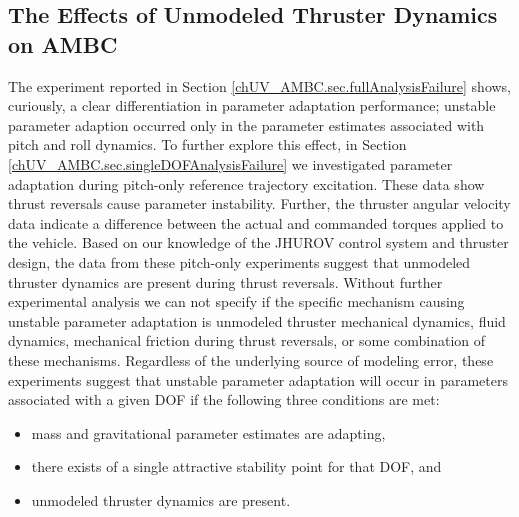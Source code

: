 \subsection{The Effects of Unmodeled Thruster Dynamics on \ac{AMBC}}

The experiment reported in Section
\ref{chUV_AMBC.sec.fullAnalysisFailure} shows, curiously, a clear
differentiation in parameter adaptation performance; unstable
parameter adaption occurred only in the parameter estimates associated
with pitch and roll dynamics.
%
To further explore this effect, in Section
\ref{chUV_AMBC.sec.singleDOFAnalysisFailure} we investigated parameter
adaptation during pitch-only reference trajectory excitation.
%
These data show thrust reversals cause parameter instability.
%
Further, the thruster angular velocity data indicate a difference
between the actual and commanded torques applied to the vehicle. 
%
Based on our knowledge of the \ac{JHUROV} control system and thruster
design, the data from these pitch-only experiments suggest that
unmodeled thruster dynamics are present during thrust reversals.
%
Without further experimental analysis we can not specify if the
specific mechanism causing unstable parameter adaptation is unmodeled
thruster mechanical dynamics, fluid dynamics, mechanical friction
during thrust reversals, or some combination of these mechanisms.
%
Regardless of the underlying source of modeling error, these
experiments suggest that unstable parameter adaptation will occur in
parameters associated with a given \ac{DOF} if the following three
conditions are met:
%
\begin{itemize}
\item mass and gravitational parameter estimates are adapting, 
\item there exists of a single attractive stability point for that \ac{DOF}, and
\item unmodeled thruster dynamics are present.
\end{itemize}


